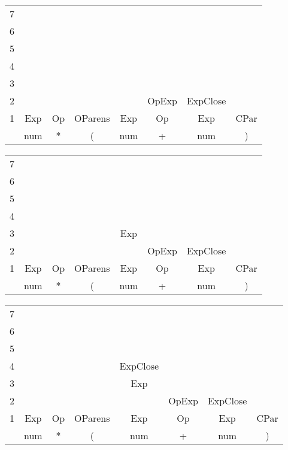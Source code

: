 \documentclass[fleqn]{article}
\begin{document}
\begin{tabular}{r | c | c | c | c  | c | c | c|}
\cline{2-2}
7 &\\\cline{2-3}
6 && \\\cline{2-4}
5 && & \\\cline{2-5}
4 && & & \\\cline{2-6}
3 && & & & \\\cline{2-7}
2 & & & &  & OpExp & ExpClose \\\cline{2-8}
1 & Exp & Op & OParens & Exp & Op & Exp & CPar \\\cline{2-8}
& num & * & ( & num & + & num & ) \\\cline{2-8}
\cline {2-8}

\end{tabular}

\vspace{0.5in}

\begin{tabular}{r | c | c | c | c | c | c | c|}
\cline{2-2}
7 &\\\cline{2-3}
6 && \\\cline{2-4}
5 && & \\\cline{2-5}
4 && & & \\\cline{2-6}
3 && & & Exp & \\\cline{2-7}
2 & & & &  & OpExp & ExpClose \\\cline{2-8}
1 & Exp & Op & OParens & Exp & Op & Exp & CPar \\\cline{2-8}
& num & * & ( & num & + & num & ) \\\cline{2-8}
\cline {2-8}

\end{tabular}

\vspace{0.5in}

\begin{tabular}{r | c | c | c | c | c | c | c|}
\cline{2-2}
7 &\\\cline{2-3}
6 && \\\cline{2-4}
5 && & \\\cline{2-5}
4 && & & ExpClose \\\cline{2-6}
3 && & & Exp & \\\cline{2-7}
2 & & & &  & OpExp & ExpClose \\\cline{2-8}
1 & Exp & Op & OParens & Exp & Op & Exp & CPar \\\cline{2-8}
& num & * & ( & num & + & num & ) \\\cline{2-8}
\cline {2-8}

\end{tabular}
\end{document}
